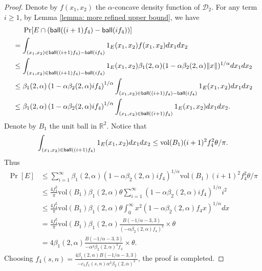 \documentclass[11pt]{article}
\newcommand{\R}{\mathbb{R}}
\newcommand{\ball}{\textup{\textsf{ball}}}
\begin{document}
{{{{\begin{proof}
Denote by $f(x_1,x_2)$ the $\alpha$-concave density function of $\mathcal{D}_2$. For any term $i\ge 1$, by Lemma \ref{lemma: more refined upper bound}, we have
\begin{equation*}
\begin{split}
&\ \ \ \ \Pr[E\cap (\ball((i+1)f_4)-\ball(if_4))]\\
&=\int_{(x_1,x_2)\in \ball((i+1)f_4)-\ball(if_4)}1_E(x_1,x_2)f(x_1,x_2)dx_1dx_2\\
&\le \int_{(x_1,x_2)\in \ball((i+1)f_4)-\ball(if_4)}1_E(x_1,x_2)\beta_1(2,\alpha)(1-\alpha\beta_2(2,\alpha)\|x\|)^{1/\alpha}dx_1dx_2\\
&\le \beta_1(2,\alpha)\left(1-\alpha\beta_2(2,\alpha)if_4\right)^{1/\alpha}\int_{(x_1,x_2)\in \ball((i+1)f_4)-\ball(if_4)}1_E(x_1,x_2)dx_1dx_2\\
&\le \beta_1(2,\alpha)\left(1-\alpha\beta_2(2,\alpha)if_4\right)^{1/\alpha}\int_{(x_1,x_2)\in \ball((i+1)f_4)}1_E(x_1,x_2)dx_1dx_2.
\end{split}
\end{equation*}
Denote by $B_1$ the unit ball in $\R^2$. Notice that
\begin{equation*}
\int_{(x_1,x_2)\in \ball((i+1)f_4)}1_E(x_1,x_2)dx_1dx_2\le \text{vol}(B_1)(i+1)^2f_4^2\theta/\pi.
\end{equation*}
Thus
\begin{equation*}
\begin{split}
\Pr[E]&\le\sum_{i=1}^\infty \beta_1(2,\alpha)\left(1-\alpha\beta_2(2,\alpha)if_4\right)^{1/\alpha}\text{vol}(B_1)(i+1)^2f_4^2\theta/\pi\\
&\le \frac{4f_4^2}{\pi}\text{vol}(B_1)\beta_1(2,\alpha)\theta\sum_{i=1}^\infty (1-\alpha\beta_2(2,\alpha)if_4)^{1/\alpha}i^2\\
&\le \frac{4f_4^2}{\pi}\text{vol}(B_1)\beta_1(2,\alpha)\theta\int_0^\infty x^2(1-\alpha\beta_2(2,\alpha)f_4x)^{1/\alpha}dx\\
&=\frac{4f_4^2}{\pi}\text{vol}(B_1)\beta_1(2,\alpha) \frac{B(-1/\alpha-3,3)}{(-\alpha\beta_2(2,\alpha)f_4)^3}\times \theta\\
&=4\beta_1(2,\alpha) \frac{B(-1/\alpha-3,3)}{-\alpha^3\beta_2(2,\alpha)^3f_4}\times \theta.
\end{split}
\end{equation*}
Choosing $f_4(s,n)=\frac{4\beta_1(2,\alpha)B(-1/\alpha-3,3)}{-c_1f_1(s,n)\alpha^3\beta_2(2,\alpha)^3}$, the proof is completed.
\end{proof}







}}}}
\end{document}
